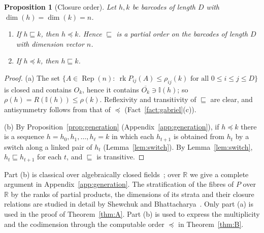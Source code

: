 \documentclass[11pt,a4paper]{article}
\newtheorem{proposition}[theorem]{Proposition}
\theoremstyle{definition}
\theoremstyle{remark}
\numberwithin{equation}{section}
\newcommand{\R}{\mathbb{R}}
\newcommand{\Rep}{\operatorname{Rep}}
\newcommand{\rk}{\operatorname{rk}}
\newcommand{\I}{\mathbb I}
\begin{document}
\begin{proposition}[Closure order]\label{prop:closure}
Let $h,k$ be barcodes of length $D$ with $\dim(h)=\dim(k)=n$.
\begin{enumerate}[label=\textup{(\alph*)}]
\item If $h\sqsubseteq k$, then $h\preceq k$. Hence $\sqsubseteq$ is a partial order on the barcodes of length $D$ with dimension vector $n$.
\item If $h\preceq k$, then $h\sqsubseteq k$.
\end{enumerate}
\end{proposition}
\begin{proof}
(a) The set $\{A\in\Rep(n):\ \rk P_{ij}(A)\le\rho_{ij}(k)\text{ for all }0\le i\le j\le D\}$ is closed and contains $O_k$, hence it contains $\overline{O_k}\ni\I(h)$; so $\rho(h)=R(\I(h))\le\rho(k)$. Reflexivity and transitivity of $\sqsubseteq$ are clear, and antisymmetry follows from that of $\preceq$ (Fact~\ref{fact:gabriel}(c)).

(b) By Proposition~\ref{prop:generation} (Appendix~\ref{app:generation}), if $h\preceq k$ there is a sequence $h=h_0,h_1,\dots,h_\ell=k$ in which each $h_{t+1}$ is obtained from $h_t$ by a switch along a linked pair of $h_t$ (Lemma~\ref{lem:switch}). By Lemma~\ref{lem:switch}, $h_t\sqsubseteq h_{t+1}$ for each $t$, and $\sqsubseteq$ is transitive.
\end{proof}
Part (b) is classical over algebraically closed fields~\cite{abeasis-delfra-kraft}; over $\R$ we give a complete argument in Appendix~\ref{app:generation}. The stratification of the fibres of $P$ over $\R$ by the ranks of partial products, the dimensions of its strata and their closure relations are studied in detail by Shewchuk and Bhattacharya~\cite{shewchuk-bhattacharya}. Only part (a) is used in the proof of Theorem~\ref{thm:A}. Part (b) is used to express the multiplicity and the codimension through the computable order $\preceq$ in Theorem~\ref{thm:B}.
\end{document}
